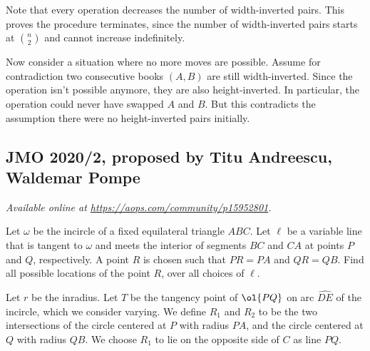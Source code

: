 \documentclass[11pt]{scrartcl}
\begin{document}
Note that every operation decreases the number of width-inverted pairs.
This proves the procedure terminates,
since the number of width-inverted pairs starts at $\binom n2$
and cannot increase indefinitely.

Now consider a situation where no more moves are possible.
Assume for contradiction two consecutive books $(A,B)$ are still width-inverted.
Since the operation isn't possible anymore, they are also height-inverted.
In particular, the operation could never have swapped $A$ and $B$.
But this contradicts the assumption there were no height-inverted pairs initially.
\pagebreak

\subsection{JMO 2020/2, proposed by Titu Andreescu, Waldemar Pompe}
\textsl{Available online at \url{https://aops.com/community/p15952801}.}
\begin{mdframed}[style=mdpurplebox,frametitle={Problem statement}]
Let $\omega$ be the incircle of a
fixed equilateral triangle $ABC$.
Let $\ell$ be a variable line that is tangent to $\omega$
and meets the interior of segments $BC$ and $CA$
at points $P$ and $Q$, respectively.
A point $R$ is chosen such that $PR=PA$ and $QR=QB$.
Find all possible locations of the point $R$,
over all choices of $\ell$.
\end{mdframed}
Let $r$ be the inradius.
Let $T$ be the tangency point of $\ol{PQ}$
on arc $\widehat{DE}$ of the incircle, which we consider varying.
We define $R_1$ and $R_2$ to be the two intersections
of the circle centered at $P$ with radius $PA$,
and the circle centered at $Q$ with radius $QB$.
We choose $R_1$ to lie on the opposite side of $C$ as line $PQ$.
\end{document}
